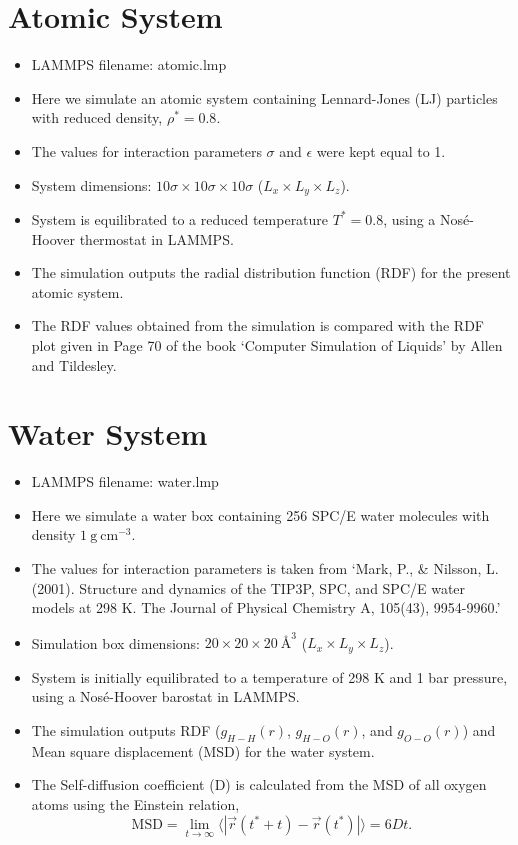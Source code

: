 \documentclass[12pt]{article}
\begin{document}
\newpage
\section{Atomic System}
\begin{itemize}
\item LAMMPS filename: atomic.lmp
\item Here we simulate an atomic system containing Lennard-Jones (LJ) particles with 
reduced density, $\rho^{*} = 0.8$.
\item The values for interaction parameters $\sigma$ and $\epsilon$ were kept equal to 1.
\item System dimensions: $10\sigma \times 10\sigma \times 10\sigma$ 
($L_{x} \times L_{y} \times L_{z}$).
\item System is equilibrated to a reduced temperature $T^{*} = 0.8$, 
using a Nos\'e-Hoover thermostat in LAMMPS.
\item The simulation outputs the radial distribution function (RDF) for the 
present atomic system.
\item The RDF values obtained from the simulation is compared with the RDF plot given 
in Page 70 of the book `Computer Simulation of Liquids' by Allen and Tildesley. 
\end{itemize}

\section{Water System}
\begin{itemize}
\item LAMMPS filename: water.lmp
\item Here we simulate a water box containing 256 SPC/E water molecules with 
density $1 \ \textrm{g} \ \textrm{cm}^{-3}$.
\item The values for interaction parameters is taken from 
`Mark, P., \& Nilsson, L. (2001). Structure and dynamics of the TIP3P, SPC, and SPC/E water models at 298 K. The Journal of Physical Chemistry A, 105(43), 9954-9960.'
\item Simulation box dimensions: $20 \times 20 \times 20 \ \textrm{\AA}^{3}$ 
($L_{x} \times L_{y} \times L_{z}$).
\item System is initially equilibrated to a temperature of 298 K and 1 bar pressure, 
using a Nos\'e-Hoover barostat in LAMMPS.
\item The simulation outputs RDF ($g_{H-H}(r)$, $g_{H-O}(r)$, and $g_{O-O}(r)$) and 
Mean square displacement (MSD) for the water system.
\item The Self-diffusion coefficient (D) is calculated from the MSD of all oxygen 
atoms using the Einstein relation,
$$\textrm{MSD} = \lim_{t\to\infty}\langle |\vec{r}(t^{*}+t) - \vec{r}(t^{*})|\rangle = 6Dt.$$

\end{itemize}



\end{document}
